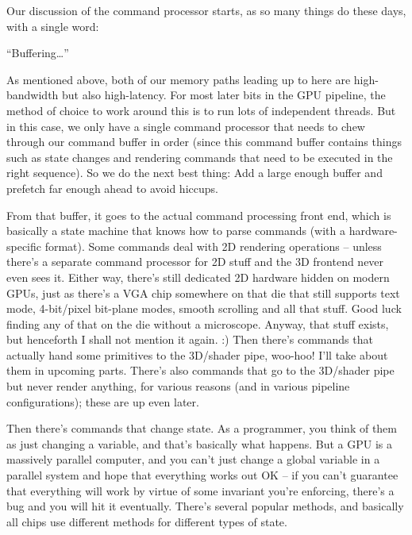 \documentclass[12pt]{article}
\begin{document}
Our discussion of the command processor starts, as so many things do these days, with a single word:

“Buffering…”

As mentioned above, both of our memory paths leading up to here are high-bandwidth but also high-latency. For most later bits in the GPU pipeline, the method of choice to work around this is to run lots of independent threads. But in this case, we only have a single command processor that needs to chew through our command buffer in order (since this command buffer contains things such as state changes and rendering commands that need to be executed in the right sequence). So we do the next best thing: Add a large enough buffer and prefetch far enough ahead to avoid hiccups.

From that buffer, it goes to the actual command processing front end, which is basically a state machine that knows how to parse commands (with a hardware-specific format). Some commands deal with 2D rendering operations – unless there’s a separate command processor for 2D stuff and the 3D frontend never even sees it. Either way, there’s still dedicated 2D hardware hidden on modern GPUs, just as there’s a VGA chip somewhere on that die that still supports text mode, 4-bit/pixel bit-plane modes, smooth scrolling and all that stuff. Good luck finding any of that on the die without a microscope. Anyway, that stuff exists, but henceforth I shall not mention it again. :) Then there’s commands that actually hand some primitives to the 3D/shader pipe, woo-hoo! I’ll take about them in upcoming parts. There’s also commands that go to the 3D/shader pipe but never render anything, for various reasons (and in various pipeline configurations); these are up even later.

Then there’s commands that change state. As a programmer, you think of them as just changing a variable, and that’s basically what happens. But a GPU is a massively parallel computer, and you can’t just change a global variable in a parallel system and hope that everything works out OK – if you can’t guarantee that everything will work by virtue of some invariant you’re enforcing, there’s a bug and you will hit it eventually. There’s several popular methods, and basically all chips use different methods for different types of state.
\end{document}
